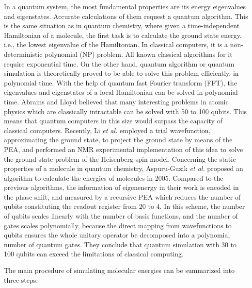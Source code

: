 \documentclass[8.5pt,twoside,twocolumn]{article}
\begin{document}
In a quantum system,
the most fundamental properties are its
energy eigenvalues and eigenstates.
Accurate calculations of them request a quantum algorithm.
This is the same situation as in quantum chemistry,
where given a time-independent Hamiltonian of a molecule,
the first task is to calculate the ground state energy, i.e.,
the lowest eigenvalue of the Hamiltonian.
In classical computers, it is a non-deterministic polynomial (NP) problem.
All known classical algorithms for it require exponential time.
On the other hand, quantum algorithm or quantum simulation
is theoretically proved to be able to solve this problem efficiently,
in polynomial time.\cite{PEA_1}
With the help of quantum fast Fourier transform (FFT),
the eigenvalues and eigenstates of a local Hamiltonian
can be solved in polynomial time.
Abrams and Lloyd\cite{PEA_1} believed that many interesting problems
in atomic physics which are classically intractable
can be solved with 50 to 100 qubits.
This means that quantum computers in this size
would surpass the capacity of classical computers.
Recently, Li \emph{et al.}\cite{Li}
employed a trial wavefunction, approximating the ground state,
to project the ground state by means of the PEA,
and performed an NMR experimental implementation of this idea
to solve the ground-state problem
of the Heisenberg spin model.
Concerning the static properties of a molecule in quantum chemistry,
Aspuru-Guzik \emph{et al.}\cite{Alan_first} proposed an algorithm
to calculate the energies of molecules in 2005.
Compared to the previous algorithms,
the information of eigenenergy in their work
is encoded in the phase shift,
and measured by a recursive PEA which
reduces the number of qubits constituting the readout register
from 20 to 4.
In this scheme, the number of qubits scales linearly
with the number of basis functions,
and the number of gates scales polynomially,
because the direct mapping from wavefunctions to qubits
ensures the whole unitary operator
be decomposed into a polynomial number of quantum gates.
They conclude\cite{Alan_first} that quantum simulation
with 30 to 100 qubits can exceed the limitations
of classical computing. %


The main procedure of simulating molecular energies can be summarized into three steps:
\end{document}
